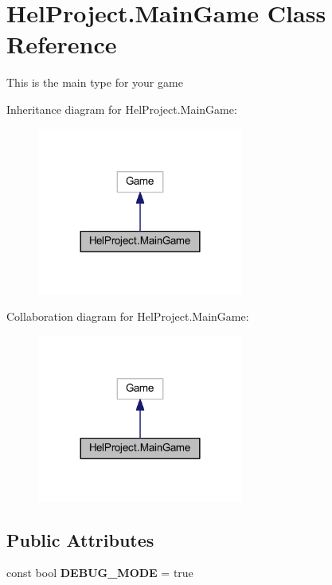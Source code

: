 \hypertarget{class_hel_project_1_1_main_game}{}\section{Hel\+Project.\+Main\+Game Class Reference}
\label{class_hel_project_1_1_main_game}


This is the main type for your game  




Inheritance diagram for Hel\+Project.\+Main\+Game\+:\nopagebreak
\begin{figure}[H]
\begin{center}
\leavevmode
\includegraphics[width=192pt]{class_hel_project_1_1_main_game__inherit__graph}
\end{center}
\end{figure}


Collaboration diagram for Hel\+Project.\+Main\+Game\+:\nopagebreak
\begin{figure}[H]
\begin{center}
\leavevmode
\includegraphics[width=192pt]{class_hel_project_1_1_main_game__coll__graph}
\end{center}
\end{figure}
\subsection*{Public Attributes}
\begin{DoxyCompactItemize}
\item 
\hypertarget{class_hel_project_1_1_main_game_ad47c2b06ec9c635e2485e7bfccf9daae}{}const bool {\bfseries D\+E\+B\+U\+G\+\_\+\+M\+O\+D\+E} = true\label{class_hel_project_1_1_main_game_ad47c2b06ec9c635e2485e7bfccf9daae}

\end{DoxyCompactItemize}
